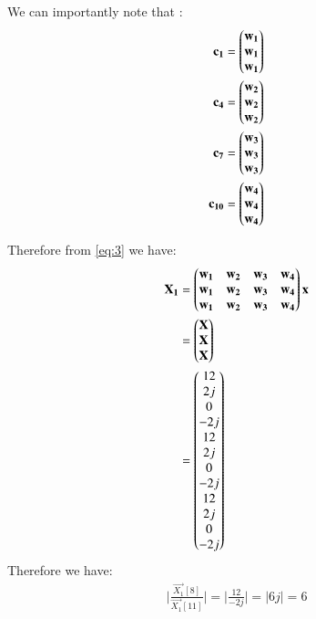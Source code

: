 \documentclass[journal,12pt,twocolumn]{IEEEtran}
\begin{document}
We can importantly note that :
\begin{align}
\mathbf{c_{1}} &= \begin{pmatrix}\mathbf{w_{1}} \\ \mathbf{w_{1}} \\ \mathbf{w_{1}}\end{pmatrix}\\
\mathbf{c_{4}} &= \begin{pmatrix}\mathbf{w_{2}} \\ \mathbf{w_{2}} \\ \mathbf{w_{2}}\end{pmatrix}\\
\mathbf{c_{7}} &= \begin{pmatrix}\mathbf{w_{3}} \\ \mathbf{w_{3}} \\ \mathbf{w_{3}}\end{pmatrix}\\
\mathbf{c_{10}} &= \begin{pmatrix}\mathbf{w_{4}} \\ \mathbf{w_{4}} \\ \mathbf{w_{4}}\end{pmatrix}
\end{align}

Therefore from \eqref{eq:3} we have:
\begin{align}
\mathbf{X_{1}} &= \begin{pmatrix}\mathbf{w_{1}} & \mathbf{w_{2}} & \mathbf{w_{3}} & \mathbf{w_{4}} \\ \mathbf{w_{1}} & \mathbf{w_{2}} & \mathbf{w_{3}} & \mathbf{w_{4}} \\ \mathbf{w_{1}} & \mathbf{w_{2}} & \mathbf{w_{3}} & \mathbf{w_{4}}\end{pmatrix}\mathbf{x}\\
&= \begin{pmatrix}\mathbf{X} \\ \mathbf{X} \\ \mathbf{X}\end{pmatrix}\\
&= \begin{pmatrix}12 \\ 2j \\ 0 \\ -2j \\ 12 \\ 2j \\ 0 \\ -2j \\ 12 \\ 2j \\ 0 \\-2j\end{pmatrix}
\end{align}
Therefore we have:
\begin{align}
\Big|{\frac{\vec{X_{1}}[8]}{\vec{X_{1}}[11]}}\Big| = \Big|{\frac{12}{-2j}}\Big| =\big|6j\big| = 6
\end{align}
\end{document}
